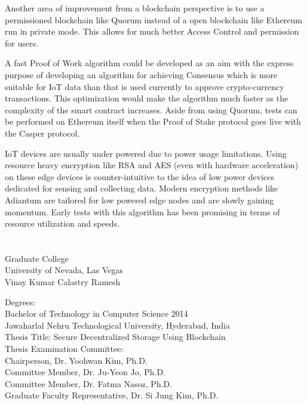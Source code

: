 \documentclass[11pt,openright]{report}
\begin{document}
Another area of improvement from a blockchain perspective is to use a permissioned blockchain like Quorum\cite{quorum} instead of a open blockchain like Ethereum run in private mode. This allows for much better Access Control and permission for users.

A fast Proof of Work algorithm could be developed as an aim with the express purpose of developing an algorithm for achieving Consensus which is more suitable for IoT data than that is used currently to approve crypto-currency transactions. This optimization would make the algorithm much faster as the complexity of the smart contract increases. Aside from using Quorum, tests can be performed on Ethereum itself when the Proof of Stake protocol goes live with the Casper protocol.

IoT devices are usually under powered due to power usage limitations. Using resource heavy encryption like RSA and AES (even with hardware acceleration) on these edge devices is counter-intuitive to the idea of low power devices dedicated for sensing and collecting data. Modern encryption methods like Adiantum \cite{DBLP:journals/tosc/CrowleyB18} are tailored for low powered edge nodes and are slowly gaining momentum. Early tests with this algorithm has been promising in terms of resource utilization and speeds.




\vita
\chapter{} %
\linespread{1.3}
\begin{center}
Graduate College\\
University of Nevada, Las Vegas\\[1cm]
Vinay Kumar Calastry Ramesh\\[1cm]
\end{center}

\noindent Degrees:\\
\indent Bachelor of Technology in Computer Science 2014\\
\indent Jawaharlal Nehru Technological University, Hyderabad, India\\

\noindent Thesis Title: Secure Decentralized Storage Using Blockchain\\

\noindent Thesis Examination Committee:\\
\indent Chairperson, Dr. Yoohwan Kim, Ph.D.\\
\indent Committee Member, Dr. Ju-Yeon Jo, Ph.D.\\
\indent Committee Member, Dr. Fatma Nasoz, Ph.D.\\
\indent Graduate Faculty Representative, Dr. Si Jung Kim, Ph.D.\\
\end{document}
